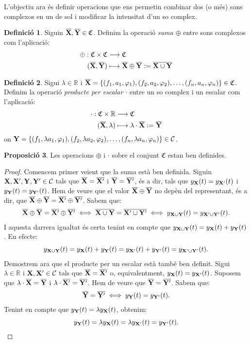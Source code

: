 \documentclass{article}
\theoremstyle{definition}
\newtheorem{definition}{Definició}[section]
\newtheorem{prop}[definition]{Proposició}
\newcommand{\0}{\ensuremath{\vb{0}}}
\newcommand{\X}{\ensuremath{\vb{X}}}
\newcommand{\Y}{\ensuremath{\vb{Y}}}
\newcommand{\RR}{\ensuremath{\mathbb{R}}} %
\begin{document}
L'objectiu ara és definir operacions que ens permetin combinar dos (o més) sons complexos en un de sol i modificar la intensitat d'un so complex.
\begin{definition}
    Siguin $\overline{\X},\overline{\Y}\in\mathfrak{C}$. Definim la operació \textit{suma $\oplus$} entre sons complexos com l'aplicació:
    \begin{align*}
        \oplus:\mathfrak{C}\times\mathfrak{C}&\longrightarrow\mathfrak{C}\\
        (\overline{\X},\overline{\Y})&\longmapsto \overline{\X}\oplus \overline{\Y}:=\overline{\X\cup\Y}
    \end{align*}
\end{definition}
\begin{definition}
    Sigui $\lambda\in\RR$ i $\overline{\X}=\{(f_1,a_1,\varphi_1),(f_2,a_2,\varphi_2),\ldots,(f_n,a_n,\varphi_n)\}\in\mathfrak{C}$. Definim la operació \textit{producte per escalar $\cdot$} entre un so complex i un escalar com l'aplicació:
    \begin{align*}
        \cdot:\mathfrak{C}\times\RR&\longrightarrow\mathfrak{C}\\
        (\overline{\X},\lambda)&\longmapsto \lambda\cdot \overline{\X}:=\overline{\Y}
    \end{align*}
    on $\Y=\{(f_1,\lambda a_1,\varphi_1),(f_2,\lambda a_2,\varphi_2),\ldots,(f_n,\lambda a_n,\varphi_n)\}\in\mathcal{C}$.
\end{definition}
\begin{prop}
    Les operacions $\oplus$ i $\cdot$ sobre el conjunt $\mathfrak{C}$ estan ben definides.
\end{prop}
\begin{proof}
    Comencem primer veient que la suma està ben definida. Siguin $\X,\X',\Y,\Y'\in\mathcal{C}$ tals que $\overline{\X}=\overline{\X'}$ i $\overline{\Y}=\overline{\Y'}$, és a dir, tals que $y_{\X}(t)=y_{\X'}(t)$ i $y_{\Y}(t)=y_{\Y'}(t)$. Hem de veure que el valor $\overline{\X}\oplus\overline{\Y}$ no depèn del representant, és a dir, que $\overline{\X}\oplus\overline{\Y}=\overline{\X'}\oplus\overline{\Y'}$. Sabem que: $$\overline{\X}\oplus\overline{\Y}=\overline{\X'}\oplus\overline{\Y'}\iff\overline{\X\cup\Y}=\overline{\X'\cup\Y'}\iff y_{\X\cup\Y}(t)=y_{\X'\cup\Y'}(t).$$ I aquesta darrera igualtat és certa tenint en compte que $y_{\X\cup\Y}(t)=y_{\X}(t)+y_{\Y}(t)$. En efecte: $$y_{\X\cup\Y}(t)=y_{\X}(t)+y_{\Y}(t)=y_{\X'}(t)+y_{\Y'}(t)=y_{\X'\cup\Y'}(t).$$
    Demostrem ara que el producte per un escalar està també ben definit. Sigui $\lambda\in\RR$ i $\X,\X'\in\mathcal{C}$ tals que $\overline{\X}=\overline{\X'}$ o, equivalentment, $y_{\X}(t)=y_{\X'}(t)$. Suposem que $\lambda\cdot\overline{\X}=\overline{\Y}$ i $\lambda\cdot\overline{\X'}=\overline{\Y'}$. Hem de veure que $\overline{\Y}=\overline{\Y'}$. Sabem que: $$\overline{\Y}=\overline{\Y'}\iff y_{\Y}(t)=y_{\Y'}(t).$$
    Tenint en compte que $y_{\Y}(t)=\lambda y_{\X}(t)$, obtenim: $$y_{\Y}(t)=\lambda y_{\X}(t)=\lambda y_{\X'}(t)=y_{\Y'}(t).$$
\end{proof}
\end{document}
